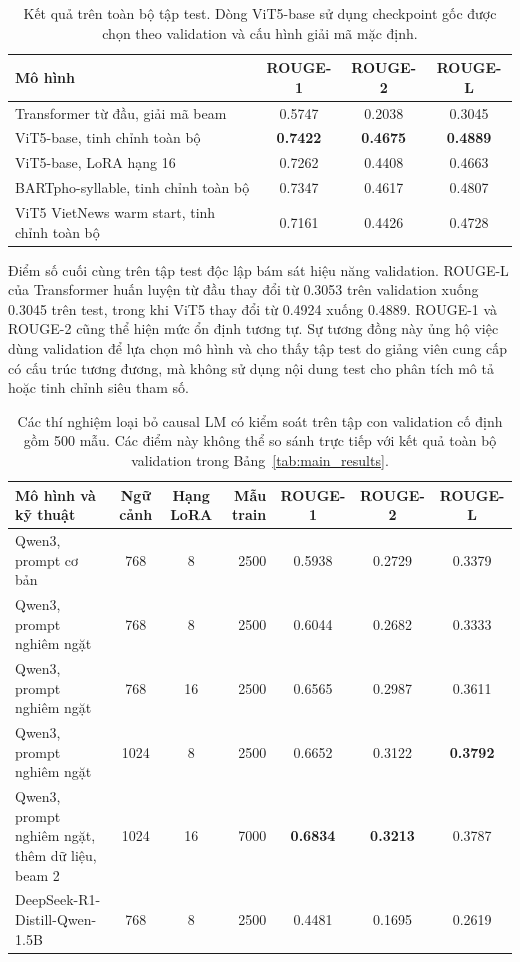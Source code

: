 \documentclass[conference]{IEEEtran}
\begin{document}
\begin{table}[htbp]
\centering
\caption{Kết quả trên toàn bộ tập test. Dòng ViT5-base sử dụng checkpoint gốc được chọn theo validation và cấu hình giải mã mặc định.}
\label{tab:test_results}
\begin{tabular}{lccc}
\toprule
Mô hình & ROUGE-1 & ROUGE-2 & ROUGE-L \\
\midrule
Transformer từ đầu, giải mã beam & 0.5747 & 0.2038 & 0.3045 \\
ViT5-base, tinh chỉnh toàn bộ & \textbf{0.7422} & \textbf{0.4675} & \textbf{0.4889} \\
ViT5-base, LoRA hạng 16 & 0.7262 & 0.4408 & 0.4663 \\
BARTpho-syllable, tinh chỉnh toàn bộ & 0.7347 & 0.4617 & 0.4807 \\
ViT5 VietNews warm start, tinh chỉnh toàn bộ & 0.7161 & 0.4426 & 0.4728 \\
\bottomrule
\end{tabular}
\end{table}

Điểm số cuối cùng trên tập test độc lập bám sát hiệu năng validation. ROUGE-L của Transformer huấn luyện từ đầu thay đổi từ 0.3053 trên validation xuống 0.3045 trên test, trong khi ViT5 thay đổi từ 0.4924 xuống 0.4889. ROUGE-1 và ROUGE-2 cũng thể hiện mức ổn định tương tự. Sự tương đồng này ủng hộ việc dùng validation để lựa chọn mô hình và cho thấy tập test do giảng viên cung cấp có cấu trúc tương đương, mà không sử dụng nội dung test cho phân tích mô tả hoặc tinh chỉnh siêu tham số.

\begin{table}[htbp]
\centering
\caption{Các thí nghiệm loại bỏ causal LM có kiểm soát trên tập con validation cố định gồm 500 mẫu. Các điểm này không thể so sánh trực tiếp với kết quả toàn bộ validation trong Bảng~\ref{tab:main_results}.}
\label{tab:qwen_ablation}
\begin{tabular}{lccrccc}
\toprule
Mô hình và kỹ thuật & Ngữ cảnh & Hạng LoRA & Mẫu train & ROUGE-1 & ROUGE-2 & ROUGE-L \\
\midrule
Qwen3, prompt cơ bản & 768 & 8 & 2500 & 0.5938 & 0.2729 & 0.3379 \\
Qwen3, prompt nghiêm ngặt & 768 & 8 & 2500 & 0.6044 & 0.2682 & 0.3333 \\
Qwen3, prompt nghiêm ngặt & 768 & 16 & 2500 & 0.6565 & 0.2987 & 0.3611 \\
Qwen3, prompt nghiêm ngặt & 1024 & 8 & 2500 & 0.6652 & 0.3122 & \textbf{0.3792} \\
Qwen3, prompt nghiêm ngặt, thêm dữ liệu, beam 2 & 1024 & 16 & 7000 & \textbf{0.6834} & \textbf{0.3213} & 0.3787 \\
DeepSeek-R1-Distill-Qwen-1.5B & 768 & 8 & 2500 & 0.4481 & 0.1695 & 0.2619 \\
\bottomrule
\end{tabular}
\end{table}
\end{document}
